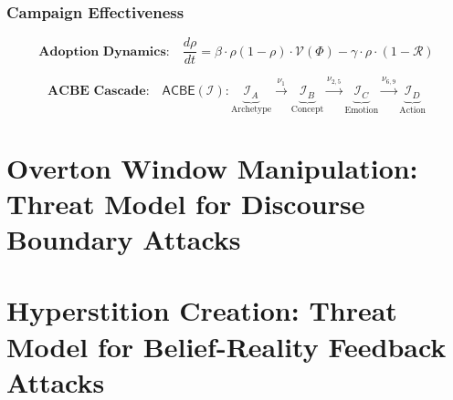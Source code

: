 \documentclass[11pt,twoside]{book}
\theoremstyle{definition}
\theoremstyle{plain}
\theoremstyle{remark}
\newcommand{\noe}[1]{\nu_{#1}}
\newcommand{\Frac}{\Phi}
\newcommand{\ACBE}{\mathsf{ACBE}}
\begin{document}
\section{Campaign Effectiveness}

\begin{equation}
\boxed{
    \textbf{Adoption Dynamics:} \quad
    \frac{d\rho}{dt} = \beta \cdot \rho(1 - \rho) \cdot \mathcal{V}(\Frac)
    - \gamma \cdot \rho \cdot (1 - \mathcal{R})
}
\label{eq:se-adoption-dynamics}
\end{equation}

\begin{equation}
\boxed{
    \textbf{ACBE Cascade:} \quad
    \ACBE(\mathcal{I}) : \underbrace{\mathcal{I}_A}_{\text{Archetype}}
    \xrightarrow{\noe{1}} \underbrace{\mathcal{I}_B}_{\text{Concept}}
    \xrightarrow{\noe{2,5}} \underbrace{\mathcal{I}_C}_{\text{Emotion}}
    \xrightarrow{\noe{6,9}} \underbrace{\mathcal{I}_D}_{\text{Action}}
}
\label{eq:se-acbe-cascade}
\end{equation}

\part{Overton Window Manipulation: Threat Model for Discourse Boundary Attacks}
\label{part:overton}



\part{Hyperstition Creation: Threat Model for Belief-Reality Feedback Attacks}
\label{part:hyperstition}



\end{document}
